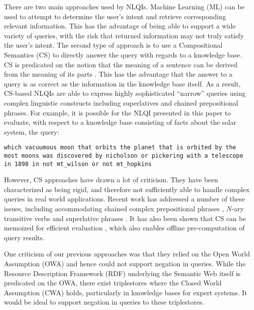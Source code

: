 \documentclass[../main.tex]{subfiles}
\begin{document}
\begin{refsection}
There are two main approaches used by NLQIs.  Machine Learning (ML) can be used to attempt to determine the user's intent and retrieve corresponding relevant information.  This has the advantage of being able to support a wide variety of queries, with the risk that returned information may not truly satisfy the user's intent.  The second type of approach is to use a Compositional Semantics (CS) to directly answer the query with regards to a knowledge base.  CS is predicated on the notion that the meaning of a sentence can be derived from the meaning of its parts \cite{Dowty:wall}.  This has the advantage that the answer to a query is as correct as the information in the knowledge base itself. As a result, CS-based NLQIs are able to express highly sophisticated ``narrow'' queries using complex linguistic constructs including superlatives and chained prepositional phrases.  For example, it is possible for the NLQI presented in this paper to evaluate, with respect to a knowledge base consisting of facts about the solar system, the query:
\begin{center}
	\texttt{which vacuumous moon that orbits the planet that is orbited by the most moons was discovered by nicholson or pickering with a telescope in 1898 in not mt\_wilson or not mt\_hopkins}
\end{center}
However, CS approaches have drawn a lot of criticism.  They have been characterized as being rigid, and therefore not sufficiently able to handle complex queries in real world applications.  Recent work has addressed a number of these issues, including accommodating chained complex prepositional phrases \cite{peelar2016accommodating}, $N$-ary transitive verbs \cite{peelar2020compositional} and superlative phrases \cite{frostpeelar2019}.  It has also been shown that CS can be memoized for efficient evaluation \cite{peelar2020webistjournal}, which also enables offline pre-computation of query results.  %

One criticism of our previous approaches was that they relied on the Open World Assumption (OWA) and hence could not support negation in queries.  While the Resource Description Framework (RDF) \cite{w3csemanticweb} underlying the Semantic Web itself is predicated on the OWA, there exist triplestores where the Closed World Assumption (CWA) holds, particularly in knowledge bases for expert systems.  It would be ideal to support negation in queries to these triplestores.


\end{refsection}
\end{document}
